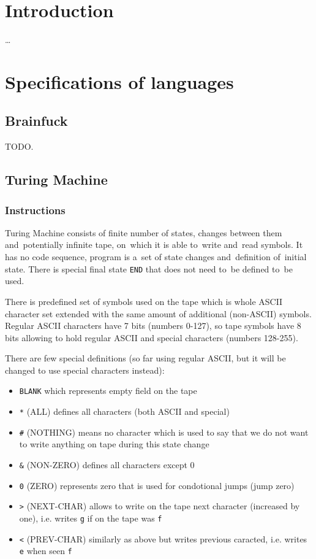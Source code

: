 \documentclass[english,shortabstract,mgr]{iithesis}
\author         {Jadwiga Pokorska}
\begin{document}

\chapter{Introduction}

\ldots

\chapter {Specifications of languages}

\section {Brainfuck}
TODO.

\section {Turing Machine}

\subsection {Instructions}

Turing Machine consists of finite number of states, changes between them
and~potentially infinite tape, on~which it is able to~write and~read symbols.
It has no code sequence, program is a~set of state changes and~definition
of~initial state. There is special final state \texttt{END} that does not need
to~be defined to~be used.

There is predefined set of symbols used on the tape which is whole ASCII character set
extended with the same amount of additional (non-ASCII) symbols. Regular
ASCII characters have 7 bits (numbers 0-127), so tape symbols have 8 bits
allowing to hold regular ASCII and special characters (numbers 128-255).

There are few special definitions (so far using regular ASCII,
but it will be changed to use special characters instead):
\begin{itemize}
  \item \texttt{BLANK} which represents empty field on the tape
  \item \texttt{*} (ALL) defines all characters (both ASCII and special)
  \item \texttt{\#} (NOTHING) means no character which is used to say
                   that we do not want to write anything on tape during
                   this state change
  \item \texttt{\&} (NON-ZERO) defines all characters except 0
  \item \texttt{0} (ZERO) represents zero that is used for condotional jumps
                   (jump zero)
  \item \texttt{>} (NEXT-CHAR) allows to write on the tape next character
                   (increased by one), i.e. writes \texttt{g} if on the tape
                   was \texttt{f}
  \item \texttt{<} (PREV-CHAR) similarly as above but writes previous caracted,
                   i.e. writes \texttt{e} when seen \texttt{f}
\end{itemize}
\end{document}
